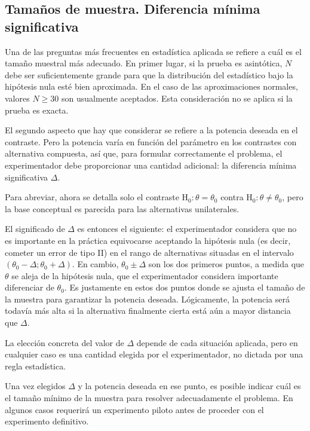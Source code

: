 \documentclass[
]{article}
\begin{document}
\subsection{Tamaños de muestra. Diferencia mínima significativa}\label{tamauxf1os-de-muestra.-diferencia-muxednima-significativa}

Una de las preguntas más frecuentes en estadística aplicada se refiere a cuál es el tamaño muestral más adecuado. En primer lugar, si la prueba es asintótica, \(N\) debe ser suficientemente grande para que la distribución del estadístico bajo la hipótesis nula esté bien aproximada. En el caso de las aproximaciones normales, valores \(N \geq 30\) son usualmente aceptados. Esta consideración no se aplica si la prueba es exacta.

El segundo aspecto que hay que considerar se refiere a la potencia deseada en el contraste. Pero la potencia varía en función del parámetro en los contrastes con alternativa compuesta, así que, para formular correctamente el problema, el experimentador debe proporcionar una cantidad adicional: la diferencia mínima significativa \(\Delta\).

Para abreviar, ahora se detalla solo el contraste \(\mathrm{H}_{0}: \theta=\theta_{0}\) contra \(\mathrm{H}_{0}: \theta \neq \theta_{0}\), pero la base conceptual es parecida para las alternativas unilaterales.

El significado de \(\Delta\) es entonces el siguiente: el experimentador considera que no es importante en la práctica equivocarse aceptando la hipótesis nula (es decir, cometer un error de tipo II) en el rango de alternativas situadas en el intervalo \((\theta_{0}-\Delta ; \theta_{0}+\Delta)\). En cambio, \(\theta_{0} \pm \Delta\) son los dos primeros puntos, a medida que \(\theta\) se aleja de la hipótesis nula, que el experimentador considera importante diferenciar de \(\theta_{0}\). Es justamente en estos dos puntos donde se ajusta el tamaño de la muestra para garantizar la potencia deseada. Lógicamente, la potencia será todavía más alta si la alternativa finalmente cierta está aún a mayor distancia que \(\Delta\).

La elección concreta del valor de \(\Delta\) depende de cada situación aplicada, pero en cualquier caso es una cantidad elegida por el experimentador, no dictada por una regla estadística.

Una vez elegidos \(\Delta\) y la potencia deseada en ese punto, es posible indicar cuál es el tamaño mínimo de la muestra para resolver adecuadamente el problema. En algunos casos requerirá un experimento piloto antes de proceder con el experimento definitivo.
\end{document}
